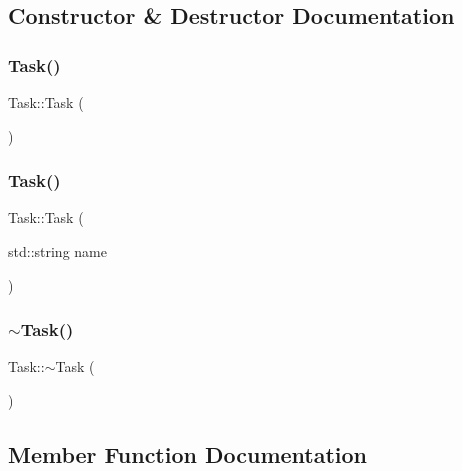 \subsection{Constructor \& Destructor Documentation}
\mbox{\label{class_task_a0ca53354bdc006762a0fda68c64f7608}} 
\subsubsection{\texorpdfstring{Task()}{Task()}\hspace{0.1cm}{\footnotesize\ttfamily [1/2]}}
{\footnotesize\ttfamily Task\+::\+Task (\begin{DoxyParamCaption}{ }\end{DoxyParamCaption})}

\mbox{\label{class_task_a26c2d4aaae7802df6c392ef1b4d38ab0}} 
\subsubsection{\texorpdfstring{Task()}{Task()}\hspace{0.1cm}{\footnotesize\ttfamily [2/2]}}
{\footnotesize\ttfamily Task\+::\+Task (\begin{DoxyParamCaption}\item[{std\+::string}]{name }\end{DoxyParamCaption})}

\mbox{\label{class_task_a3ecf499ea35fb4a96853969a1e1cbbce}} 
\subsubsection{\texorpdfstring{$\sim$\+Task()}{~Task()}}
{\footnotesize\ttfamily Task\+::$\sim$\+Task (\begin{DoxyParamCaption}{ }\end{DoxyParamCaption})}



\subsection{Member Function Documentation}
\mbox{\label{class_task_a9403859b7486d6fc373c230f5ddf442b}} 
